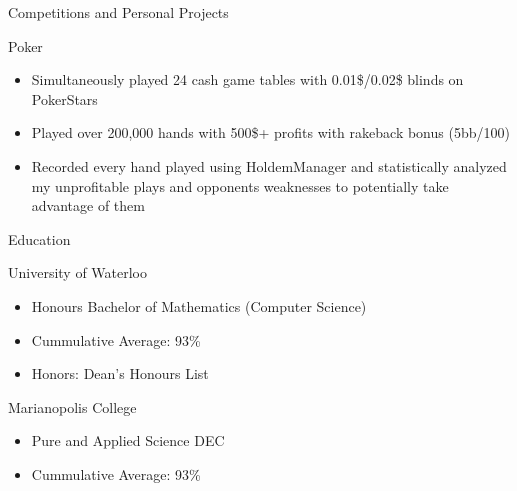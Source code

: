 \documentclass{article}
\newlength{\tabin}
\newlength{\secsep}
\newcommand{\lineunder}{\vspace*{-8pt} \\ \hspace*{-6pt} \hrulefill \\ \vspace*{-15pt}}
\newenvironment{tabbedsection}[1]{
  \begin{list}{}{
      \setlength{\itemsep}{0pt}
      \setlength{\labelsep}{0pt}
      \setlength{\labelwidth}{0pt}
      \setlength{\leftmargin}{\tabin}
      \setlength{\rightmargin}{\tabin}
      \setlength{\listparindent}{0pt}
      \setlength{\parsep}{0pt}
      \setlength{\parskip}{0pt}
      \setlength{\partopsep}{0pt}
      \setlength{\topsep}{#1}
    }
  \item[]
}{\end{list}}
\newenvironment{resume_section}[1]{
  \filbreak
  \vspace{2\secsep}
  \textsc{\large#1}
  \lineunder
  \begin{tabbedsection}{\secsep}
}{\end{tabbedsection}}
\newenvironment{resume_subsection}[2][]{
  \textbf{#2} \hfill {\footnotesize #1} \hspace{2em}
  \begin{tabbedsection}{0.5\secsep}
}{\end{tabbedsection}}
\newenvironment{subitems}{
  \renewcommand{\labelitemi}{-}
  \begin{itemize}
      \setlength{\labelsep}{1em}
}{\end{itemize}}
\begin{document}
\begin{resume_section}{Competitions and Personal Projects}
  \begin{resume_subsection}{Poker}
    \begin{subitems}
      \item Simultaneously played 24 cash game tables with 0.01\$/0.02\$ blinds on PokerStars
      \item Played over 200,000 hands with 500\$+ profits with rakeback bonus (5bb/100)
      \item Recorded every hand played using HoldemManager and statistically analyzed my unprofitable plays and opponents weaknesses to potentially take advantage of them
    \end{subitems}
  \end{resume_subsection}
\end{resume_section}

\begin{resume_section}{Education}
  \begin{resume_subsection}{University of Waterloo}
    \begin{subitems}
      \item Honours Bachelor of Mathematics (Computer Science)
      \item Cummulative Average: 93\%
      \item Honors: Dean's Honours List
    \end{subitems}
  \end{resume_subsection}
  
  
  \begin{resume_subsection}[Westmount, QC (2010--2012)]{Marianopolis College}
    \begin{subitems}
      \item Pure and Applied Science DEC
      \item Cummulative Average: 93\%
     \end{subitems}
  \end{resume_subsection}
\end{resume_section}
\end{document}
